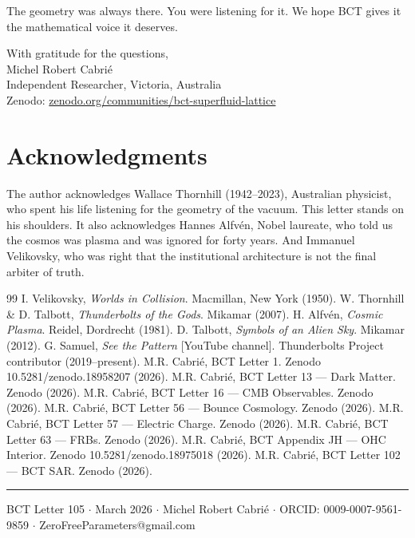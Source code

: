 \documentclass[twocolumn,10pt]{article}
\begin{document}
The geometry was always there. You were listening for it.
We hope BCT gives it the mathematical voice it deserves.

With gratitude for the questions,\\
Michel Robert Cabri\'{e}\\
Independent Researcher, Victoria, Australia\\
Zenodo: \href{https://zenodo.org/communities/bct-superfluid-lattice}{zenodo.org/communities/bct-superfluid-lattice}

\section*{Acknowledgments}
The author acknowledges Wallace Thornhill (1942--2023), Australian
physicist, who spent his life listening for the geometry of the
vacuum. This letter stands on his shoulders. It also acknowledges
Hannes Alfv\'{e}n, Nobel laureate, who told us the cosmos was
plasma and was ignored for forty years. And Immanuel Velikovsky,
who was right that the institutional architecture is not the
final arbiter of truth.

\begin{thebibliography}{99}
 I. Velikovsky, \textit{Worlds in Collision}.
    Macmillan, New York (1950).
 W. Thornhill \& D. Talbott,
    \textit{Thunderbolts of the Gods}. Mikamar (2007).
 H. Alfv\'{e}n, \textit{Cosmic Plasma}.
    Reidel, Dordrecht (1981).
 D. Talbott,
    \textit{Symbols of an Alien Sky}. Mikamar (2012).
 G. Samuel, \textit{See the Pattern} [YouTube channel].
    Thunderbolts Project contributor (2019--present).
 M.R. Cabri\'{e}, BCT Letter 1.
    Zenodo 10.5281/zenodo.18958207 (2026).
 M.R. Cabri\'{e}, BCT Letter 13 --- Dark Matter.
    Zenodo (2026).
 M.R. Cabri\'{e}, BCT Letter 16 --- CMB Observables.
    Zenodo (2026).
 M.R. Cabri\'{e}, BCT Letter 56 --- Bounce Cosmology.
    Zenodo (2026).
 M.R. Cabri\'{e}, BCT Letter 57 --- Electric Charge.
    Zenodo (2026).
 M.R. Cabri\'{e}, BCT Letter 63 --- FRBs.
    Zenodo (2026).
 M.R. Cabri\'{e}, BCT Appendix JH --- OHC Interior.
    Zenodo 10.5281/zenodo.18975018 (2026).
 M.R. Cabri\'{e}, BCT Letter 102 --- BCT SAR.
    Zenodo (2026).
\end{thebibliography}

\vspace{8pt}\noindent\rule{\linewidth}{0.4pt}
\small BCT Letter 105 $\cdot$ March 2026 $\cdot$ Michel Robert Cabri\'{e}
$\cdot$ ORCID: 0009-0007-9561-9859 $\cdot$ ZeroFreeParameters@gmail.com
\end{document}

